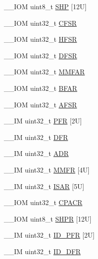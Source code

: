 \begin{DoxyCompactItemize}
\+\_\+\+\_\+\+I\+OM uint8\+\_\+t \hyperlink{struct_s_c_b___type_a293826a2c44f754e80af03d62f62f9e6}{S\+HP} \mbox{[}12\+U\mbox{]}
\item 
\+\_\+\+\_\+\+I\+OM uint32\+\_\+t \hyperlink{struct_s_c_b___type_a0f9e27357254e6e953a94f95bda040b1}{C\+F\+SR}
\item 
\+\_\+\+\_\+\+I\+OM uint32\+\_\+t \hyperlink{struct_s_c_b___type_ab974e7ceb2e52a3fbcaa84e06e52922d}{H\+F\+SR}
\item 
\+\_\+\+\_\+\+I\+OM uint32\+\_\+t \hyperlink{struct_s_c_b___type_a3b590075aa07880ce686d5cfb4e61c5c}{D\+F\+SR}
\item 
\+\_\+\+\_\+\+I\+OM uint32\+\_\+t \hyperlink{struct_s_c_b___type_ae9d94d186615d57d38c9253cb842d244}{M\+M\+F\+AR}
\item 
\+\_\+\+\_\+\+I\+OM uint32\+\_\+t \hyperlink{struct_s_c_b___type_a3fde073744418e2fe476333cb4d55d0d}{B\+F\+AR}
\item 
\+\_\+\+\_\+\+I\+OM uint32\+\_\+t \hyperlink{struct_s_c_b___type_a3ef0057e48fdef798f2ee12125a80d9f}{A\+F\+SR}
\item 
\+\_\+\+\_\+\+IM uint32\+\_\+t \hyperlink{struct_s_c_b___type_a1ecf64bb2faf3ee512e4b40a290e4d71}{P\+FR} \mbox{[}2\+U\mbox{]}
\item 
\+\_\+\+\_\+\+IM uint32\+\_\+t \hyperlink{struct_s_c_b___type_ae2b3d4530d1b0c05593b634dc46348bd}{D\+FR}
\item 
\+\_\+\+\_\+\+IM uint32\+\_\+t \hyperlink{struct_s_c_b___type_a72572af6d5dece4947453aeabd52575f}{A\+DR}
\item 
\+\_\+\+\_\+\+IM uint32\+\_\+t \hyperlink{struct_s_c_b___type_a2d4cde1c9462f3733ab65d97f308c6fb}{M\+M\+FR} \mbox{[}4\+U\mbox{]}
\item 
\+\_\+\+\_\+\+IM uint32\+\_\+t \hyperlink{struct_s_c_b___type_af3bf768338667219b55cc904fa5b87f9}{I\+S\+AR} \mbox{[}5\+U\mbox{]}
\item 
\+\_\+\+\_\+\+I\+OM uint32\+\_\+t \hyperlink{struct_s_c_b___type_ab8e9dd6ca5f31244ea352ed0c19155d8}{C\+P\+A\+CR}
\item 
\+\_\+\+\_\+\+I\+OM uint8\+\_\+t \hyperlink{struct_s_c_b___type_a49f5a554705aebf542765b3a38f4feb9}{S\+H\+PR} \mbox{[}12\+U\mbox{]}
\item 
\+\_\+\+\_\+\+IM uint32\+\_\+t \hyperlink{struct_s_c_b___type_a37569b15cd2c9a50691e8b5e15a1d129}{I\+D\+\_\+\+P\+FR} \mbox{[}2\+U\mbox{]}
\item 
\+\_\+\+\_\+\+IM uint32\+\_\+t \hyperlink{struct_s_c_b___type_a883f7e28417c51d3a3bf03185baf448f}{I\+D\+\_\+\+D\+FR}
\item 

\end{DoxyCompactItemize}
